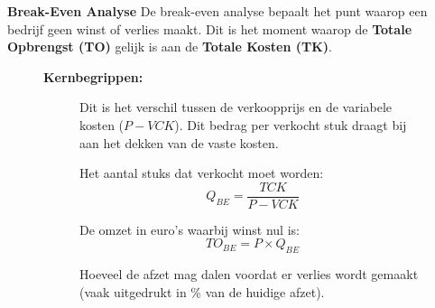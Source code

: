\documentclass[a4paper,11pt]{article}
\begin{document}
\begin{description}
\textbf{Break-Even Analyse}
\newline
De break-even analyse bepaalt het punt waarop een bedrijf geen winst of verlies maakt. Dit is het moment waarop de \textbf{Totale Opbrengst (TO)} gelijk is aan de \textbf{Totale Kosten (TK)}.

\begin{figure}[ht]
    \centering
    \begin{minipage}{0.45\textwidth}
        \textbf{Kernbegrippen:}
        \begin{description}
            \item[] Dit is het verschil tussen de verkoopprijs en de variabele kosten ($P - VCK$). Dit bedrag per verkocht stuk draagt bij aan het dekken van de vaste kosten.
            \item[] Het aantal stuks dat verkocht moet worden:
            \[ Q_{BE} = \frac{TCK}{P - VCK} \]
            \item[] De omzet in euro's waarbij winst nul is:
            \[ TO_{BE} = P \times Q_{BE} \]
            \item[] Hoeveel de afzet mag dalen voordat er verlies wordt gemaakt (vaak uitgedrukt in \% van de huidige afzet).
        \end{description}
    \end{minipage}%
    \hfill
    \begin{minipage}{0.5\textwidth}
        \centering
\end{minipage}
\end{figure}
\end{description}
\end{document}
